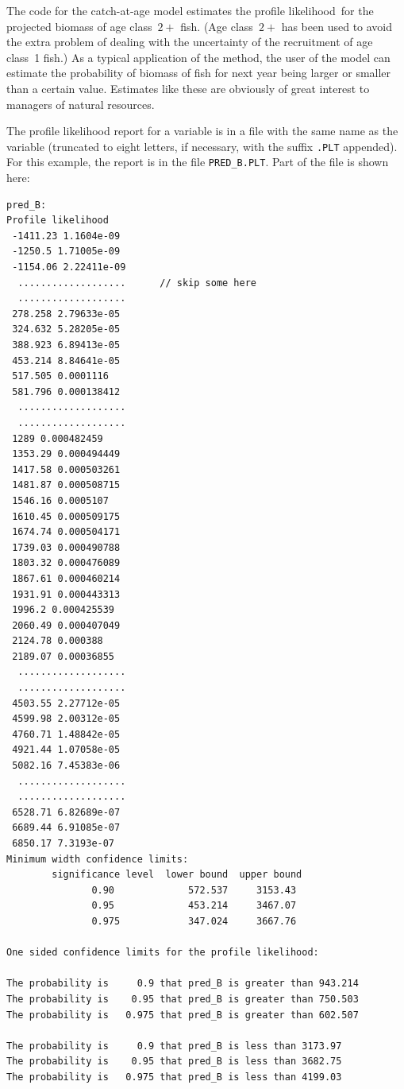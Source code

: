 \documentclass{admbmanual}
\newcommand\apl{profile likelihood}
\begin{document}
The code for the catch-at-age model estimates
the \apl\ for the projected biomass
of age class~$2+$ fish. (Age class~$2+$ has been used to avoid the
extra problem of dealing with the uncertainty of the
recruitment of age class~1 fish.)  As a typical application
of the method, the user of the model can
estimate the probability of biomass 
of fish for next year being larger or smaller than a certain
value. Estimates like these are
obviously of great interest to managers of natural resources.  

The profile likelihood report for a variable is in a file
with the same name as the variable (truncated to eight letters,
if necessary, with the suffix \texttt{.PLT} appended). For this example,
the report is in the file \texttt{PRED\_B.PLT}. Part of the file is shown here:
\begin{lstlisting}
pred_B:
Profile likelihood
 -1411.23 1.1604e-09
 -1250.5 1.71005e-09
 -1154.06 2.22411e-09
  ...................      // skip some here
  ...................
 278.258 2.79633e-05
 324.632 5.28205e-05
 388.923 6.89413e-05
 453.214 8.84641e-05
 517.505 0.0001116
 581.796 0.000138412
  ...................
  ...................
 1289 0.000482459
 1353.29 0.000494449
 1417.58 0.000503261
 1481.87 0.000508715
 1546.16 0.0005107
 1610.45 0.000509175
 1674.74 0.000504171
 1739.03 0.000490788
 1803.32 0.000476089
 1867.61 0.000460214
 1931.91 0.000443313
 1996.2 0.000425539
 2060.49 0.000407049
 2124.78 0.000388
 2189.07 0.00036855
  ...................
  ...................
 4503.55 2.27712e-05
 4599.98 2.00312e-05
 4760.71 1.48842e-05
 4921.44 1.07058e-05
 5082.16 7.45383e-06
  ...................
  ...................
 6528.71 6.82689e-07
 6689.44 6.91085e-07
 6850.17 7.3193e-07
Minimum width confidence limits:
        significance level  lower bound  upper bound
               0.90             572.537     3153.43
               0.95             453.214     3467.07
               0.975            347.024     3667.76

One sided confidence limits for the profile likelihood:

The probability is     0.9 that pred_B is greater than 943.214
The probability is    0.95 that pred_B is greater than 750.503
The probability is   0.975 that pred_B is greater than 602.507

The probability is     0.9 that pred_B is less than 3173.97
The probability is    0.95 that pred_B is less than 3682.75
The probability is   0.975 that pred_B is less than 4199.03
\end{lstlisting}
\end{document}
